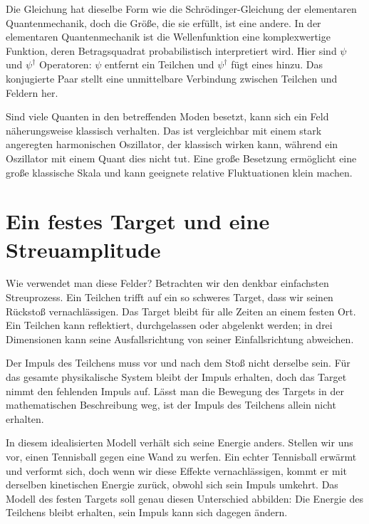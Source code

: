 Die Gleichung hat dieselbe Form wie die Schr\"odinger-Gleichung der elementaren Quantenmechanik, doch die Größe, die sie erfüllt, ist eine andere. In der elementaren Quantenmechanik ist die Wellenfunktion eine komplexwertige Funktion, deren Betragsquadrat probabilistisch interpretiert wird. Hier sind \(\psi\) und \(\psi^\dagger\) Operatoren: \(\psi\) entfernt ein Teilchen und \(\psi^\dagger\) fügt eines hinzu. Das konjugierte Paar stellt eine unmittelbare Verbindung zwischen Teilchen und Feldern her.

Sind viele Quanten in den betreffenden Moden besetzt, kann sich ein Feld näherungsweise klassisch verhalten. Das ist vergleichbar mit einem stark angeregten harmonischen Oszillator, der klassisch wirken kann, während ein Oszillator mit einem Quant dies nicht tut. Eine große Besetzung ermöglicht eine große klassische Skala und kann geeignete relative Fluktuationen klein machen.


\section{Ein festes Target und eine Streuamplitude}

Wie verwendet man diese Felder? Betrachten wir den denkbar einfachsten Streuprozess. Ein Teilchen trifft auf ein so schweres Target, dass wir seinen Rückstoß vernachlässigen. Das Target bleibt für alle Zeiten an einem festen Ort. Ein Teilchen kann reflektiert, durchgelassen oder abgelenkt werden; in drei Dimensionen kann seine Ausfallsrichtung von seiner Einfallsrichtung abweichen.

Der Impuls des Teilchens muss vor und nach dem Stoß nicht derselbe sein. Für das gesamte physikalische System bleibt der Impuls erhalten, doch das Target nimmt den fehlenden Impuls auf. Lässt man die Bewegung des Targets in der mathematischen Beschreibung weg, ist der Impuls des Teilchens allein nicht erhalten.

In diesem idealisierten Modell verhält sich seine Energie anders. Stellen wir uns vor, einen Tennisball gegen eine Wand zu werfen. Ein echter Tennisball erwärmt und verformt sich, doch wenn wir diese Effekte vernachlässigen, kommt er mit derselben kinetischen Energie zurück, obwohl sich sein Impuls umkehrt. Das Modell des festen Targets soll genau diesen Unterschied abbilden: Die Energie des Teilchens bleibt erhalten, sein Impuls kann sich dagegen ändern.

